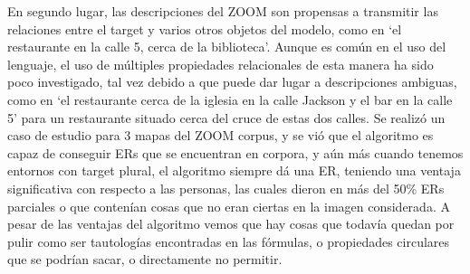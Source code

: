 En segundo lugar, las descripciones del ZOOM son propensas a transmitir las relaciones entre el target y varios otros objetos del modelo, como en `el restaurante en la calle 5, cerca de la biblioteca'. Aunque es com\'un en el uso del lenguaje, el uso de m\'ultiples propiedades relacionales de esta manera ha sido poco investigado, tal vez debido a que puede dar lugar a descripciones ambiguas, como en `el restaurante cerca de la iglesia en la calle Jackson y el bar en la calle 5' para un restaurante situado cerca del cruce de estas dos calles.
Se realiz\'o un caso de estudio para 3 mapas del ZOOM corpus, y se vi\'o que el algoritmo es capaz de conseguir ERs que se encuentran en corpora, y a\'un m\'as cuando tenemos entornos con target plural, el algoritmo siempre d\'a una ER, teniendo una ventaja significativa con respecto a las personas, las cuales dieron en m\'as del 50\% ERs parciales o que conten\'ian cosas que no eran ciertas en la imagen considerada. A pesar de las ventajas del algoritmo vemos que hay cosas que todav\'ia quedan por pulir como ser tautolog\'ias encontradas en las f\'ormulas, o propiedades circulares que se podr\'ian sacar, o directamente no permitir.

 

